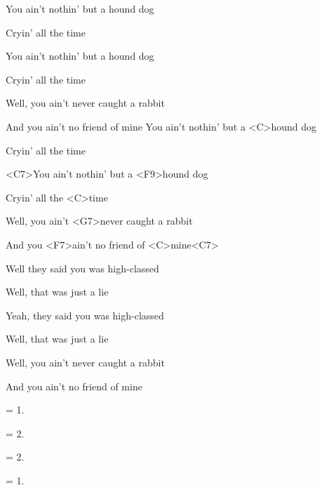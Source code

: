 
\ifdefined\TPBAND
\zs
You ain't nothin' but a hound dog

Cryin' all the time

You ain't nothin' but a hound dog

Cryin' all the time

Well, you ain't never caught a rabbit

And you ain't no friend of mine
\ks
\else
\zs
You ain't nothin' but a <C>hound dog

Cryin' all the time

<C7>You ain't nothin' but a <F9>hound dog

Cryin' all the <C>time

Well, you ain't <G7>never caught a rabbit

And you <F7>ain't no friend of <C>mine<C7>
\ks
\fi


\zs
Well they said you was high-classed
 
Well, that was just a lie

Yeah, they said you was high-classed

Well, that was just a lie

Well, you ain't never caught a rabbit

And you ain't no friend of mine
\ks

\zs
= 1.
\ks

\zs
= 2.
\ks

\zs
= 2.
\ks

\zs
= 1.
\ks

\kp

